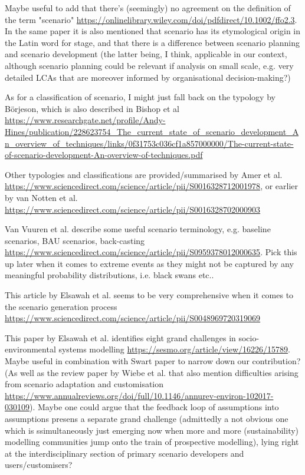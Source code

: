 \documentclass{article}
\begin{document}
Maybe useful to add that there's (seemingly) no agreement on the definition of the term "scenario" \url{https://onlinelibrary.wiley.com/doi/pdfdirect/10.1002/ffo2.3}. In the same paper it is also mentioned that scenario has its etymological origin in the Latin word for stage, and that there is a difference between scenario planning and scenario development (the latter being, I think, applicable in our context, although scenario planning could be relevant if analysis on small scale, e.g. very detailed LCAs that are moreover informed by organisational decision-making?)

As for a classification of scenario, I might just fall back on the typology by Börjeson, which is also described in Bishop et al \url{https://www.researchgate.net/profile/Andy-Hines/publication/228623754_The_current_state_of_scenario_development_An_overview_of_techniques/links/0f31753c036cf1a857000000/The-current-state-of-scenario-development-An-overview-of-techniques.pdf}

Other typologies and classifications are provided/summarised by Amer et al. \url{https://www.sciencedirect.com/science/article/pii/S0016328712001978}, or earlier by van Notten et al. \url{https://www.sciencedirect.com/science/article/pii/S0016328702000903}

Van Vuuren et al. describe some useful scenario terminology, e.g. baseline scenarios, BAU scenarios, back-casting \url{https://www.sciencedirect.com/science/article/pii/S0959378012000635}. Pick this up later when it comes to extreme events as they might not be captured by any meaningful probability distributions, i.e. black swans etc..

This article by Elsawah et al. seems to be very comprehensive when it comes to the scenario generation process \url{https://www.sciencedirect.com/science/article/pii/S0048969720319069}

This paper by Elsawah et al. identifies eight grand challenges in socio-environmental systems modelling \url{https://sesmo.org/article/view/16226/15789}. Maybe useful in combination with Swart paper to narrow down our contribution? (As well as the review paper by Wiebe et al. that also mention difficulties arising from scenario adaptation and customisation \url{https://www.annualreviews.org/doi/full/10.1146/annurev-environ-102017-030109}). Maybe one could argue that the feedback loop of assumptions into assumptions presens a separate grand challenge (admittedly a not obvious one which is ssimultaneously just emerging now when more and more (sustainability) modelling communities jump onto the train of prospective modelling), lying right at the interdisciplinary section of primary scenario developers and users/customisers?
\end{document}
